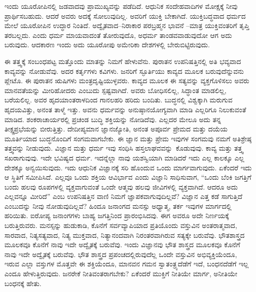 \vskip 0.2cm 

ಇಂದು ಯೂರೋಪಿನಲ್ಲಿ ಜಡವಾದವು ಪ್ರಾಮುಖ್ಯವನ್ನು ಪಡೆದಿದೆ. ಆಧುನಿಕ ಸಂದೇಹವಾದಿಗಳ ಮೋಕ್ಷಕ್ಕೆ ನೀವು ಪ್ರಾರ್ಥಿಸಬಹುದು. ಆದರೆ ಅವರು ಅದಕ್ಕೆ ಸೋಲುವುದಿಲ್ಲ. ಅವರಿಗೆ ಯುಕ್ತಿ ಬೇಕಾಗಿದೆ. ಯುಕ್ತಿಬದ್ಧವಾದ ಧರ್ಮದ ಮೇಲೆ ಯೂರೋಪಿನ ಉದ್ಧಾರ ನಿಂತಿದೆ. ಅದ್ವೈತವಾದ–ನಿರಾಕಾರ ಪರಬ್ರಹ್ಮನ ಭಾವನೆ –ಮಾತ್ರ ಯುಕ್ತಿವಂತರಿಗೆ ತೃಪ್ತಿ ತರಬಲ್ಲದು. ಎಂದು ಧರ್ಮ ಮಾಯವಾದಂತೆ ತೋರುವುದೊ, ಅಧರ್ಮ ತಾಂಡವವಾಡುವುದೋ ಆಗ ಅದು ಬರುವುದು. ಆದಕಾರಣ ಇಂದು ಅದು ಯೂರೋಪು ಅಮೇರಿಕಾ ದೇಶಗಳಲ್ಲಿ ಬೇರುಬಿಟ್ಟಿರುವುದು.

\vskip 0.2cm 

ಈ ತತ್ತ್ವಕ್ಕೆ ಸಂಬಂಧಪಟ್ಟ ಮತ್ತೊಂದು ಮಾತನ್ನು ನಿಮಗೆ ಹೇಳುವೆನು. ಪುರಾತನ ಉಪನಿಷತ್ತಿನಲ್ಲಿ ಅತಿ ಭವ್ಯವಾದ ಕಾವ್ಯವನ್ನು ನೋಡುವೆವು. ಅದರ ಕರ್ತೃಗಳು ಕವಿಗಳು. ಜನರಿಗೆ ಸ್ಫೂರ್ತಿಯು ಕಾವ್ಯದ ಮೂಲಕ ಬರುವುದೆನ್ನುವನು ಪ್ಲೇಟೊ. ಈ ಪುರಾತನ ಋಷಿಗಳು ಮಂತ್ರದೃಷ್ಟಿಯುಳ್ಳವರು. ಕಾವ್ಯದ ಮೂಲಕ ಈ ಸತ್ಯವನ್ನು ವ್ಯಕ್ತಗೊಳಿಸಲು ಅವರು ಮಾನವತೆಯನ್ನು ಮೀರಿಹೋದರು ಎಂಬುದು ಸ್ಪಷ್ಟವಾಗಿದೆ. ಅವರು ಬೋಧಿಸಲಿಲ್ಲ, ಸಿದ್ಧಾಂತ ಮಾಡಲಿಲ್ಲ, ಬರೆಯಲಿಲ್ಲ. ಅವರ ಹೃದಯಾಂತರಾಳದಿಂದ ಗಾನಲಹರಿ ಹರಿದು ಬಂದಿತು. ಬುದ್ಧನಲ್ಲಿ ವಿಶ್ವಕ್ಕಾಗಿ ಮರುಗುವ ಹೃದಯವಿತ್ತು, ಅನಂತ ತಾಳ್ಮೆ ಇತ್ತು. ಅವನು ಧರ್ಮವನ್ನು ಅನುಷ್ಠಾನಯೋಗ್ಯವಾಗಿ ಮಾಡಿ ಎಲ್ಲರಿಗೂ ನಿಲುಕುವಂತೆ ಮಾಡಿದ. ಶಂಕರಾಚಾರ್ಯರಲ್ಲಿ ಪ್ರಚಂಡ ಬುದ್ಧಿ ಶಕ್ತಿಯನ್ನು ನೋಡಿದೆವು. ಎಲ್ಲದರ ಮೇಲೂ ಅದು ತನ್ನ ತೀಕ್ಷ್ಣಪ್ರಭೆಯನ್ನು ಬೀರುತ್ತಿತ್ತು. ದೇದೀಪ್ಯಮಾನ ಜ್ಞಾನಜ್ಯೋತಿ, ಅನಂತ ಅಪೂರ್ವ ಪ್ರೇಮದ ಮತ್ತು ದಯೆಯ ಮೂರ್ತಿಯಾದ ಬುದ್ಧನೊಂದಿಗೆ ಸಂಗಮವಾಗಬೇಕು. ಈ ಜ್ಞಾನ ಮತ್ತು ಪ್ರೇಮ ಇವುಗಳ ಸಂಗಮವು ನಮಗೆ ಅತಿಶ್ರೇಷ್ಠ ತತ್ತ್ವವನ್ನು ನೀಡುವುದು. ವಿಜ್ಞಾನ ಮತ್ತು ಧರ್ಮ ಇವು ಸಂಧಿಸಿ ಹಸ್ತಲಾಘವವನ್ನು\break\ ಕೊಡುವುವು. ಕಾವ್ಯ ಮತ್ತು ತತ್ತ್ವ ಸಖರಾಗುವುವು. ಇದೇ ಭವಿಷ್ಯದ ಧರ್ಮ. ಇದನ್ನೆಲ್ಲಾ ನಾವು ಯಶಸ್ವಿಯಾಗಿ ಮಾಡಿದರೆ ಇದು ಎಲ್ಲ ಕಾಲಕ್ಕೂ ಎಲ್ಲ ದೇಶಕ್ಕೂ ಅನ್ವಯಿಸುವುದು. ಇದು ಆಧುನಿಕ ವಿಜ್ಞಾನಕ್ಕೆ ಸರಿ ಹೊಂದುವ ಒಂದು ಮಾರ್ಗವಾಗುವುದು. ಏಕೆಂದರೆ ಇದು ಆ ಸ್ಥಿತಿಗೆ ಸಮೀಪಿಸಿದೆ. ಎಲ್ಲವೂ ಒಂದು ಶಕ್ತಿಯ ಆವಿರ್ಭಾವ ಎಂದು ವಿಜ್ಞಾನಿ ಸಾಧಿಸುವಾಗ, “ಒಂದು ಬೆಂಕಿ ಜಗತ್ತಿಗೆ ಬಂದು ಹಲವು ರೂಪಗಳಲ್ಲಿ ವ್ಯಕ್ತವಾಗುವಂತೆ ಒಂದೇ ಆತ್ಮವು ಹಲವು ಜೀವಿಗಳಲ್ಲಿ ವ್ಯಕ್ತವಾಗಿದೆ. ಆದರೂ ಅದು ಎಲ್ಲವನ್ನೂ ಮೀರಿದೆ” ಎಂಬ ಉಪನಿಷತ್ತಿನ ವಾಣಿ ನಿಮಗೆ ಜ್ಞಾಪಕವಾಗುವುದಿಲ್ಲವೆ? ವಿಜ್ಞಾನ ಎತ್ತ ಕಡೆ ಸಾಗುತ್ತಿದೆ ಎಂಬುದನ್ನು ನೀವು ನೋಡುವುದಿಲ್ಲವೆ? ಹಿಂದೂ ಜನಾಂಗದ ಮನಸ್ಸು ಅಧ್ಯಾತ್ಮ, ತರ್ಕ ಇವುಗಳ ಮಾರ್ಗದಲ್ಲಿ ಹರಿಯಿತು. ಐರೋಪ್ಯ ಜನಾಂಗಗಳು ಬಾಹ್ಯ ಜಗತ್ತಿನಿಂದ ಪ್ರಾರಂಭಿಸಿದವು. ಈಗ ಅವರೂ ಅದೇ ನಿರ್ಣಯಕ್ಕೆ ಬರುತ್ತಿರುವರು. ಮನಸ್ಸನ್ನು ಹುಡುಕಾಡಿ, ಕೊನೆಗೆ ಸರ್ವವ್ಯಾಪಿಯಾದ ಪ್ರತಿಯೊಂದು ವಸ್ತುವಿನ ಅಂತರಾತ್ಮವಾದ, ಸಾರವಾದ, ನಿತ್ಯಸತ್ಯವಾದ, ನಿತ್ಯ ಮುಕ್ತವಾದ, ನಿತ್ಯಾನಂದವಾಗಿ ನಿರಂತರವಾಗಿರುವ ಸತ್ಯಕ್ಕೇ ಬರುವೆವು. ಭೌತಶಾಸ್ತ್ರದ ಮೂಲಕವೂ ಕೊನೆಗೆ ನಾವು ಇದೇ ಅದ್ವೈತಕ್ಕೆ ಬರುವೆವು. ಇಂದು ವಿಜ್ಞಾನವು ಭೌತ ಶಾಸ್ತ್ರದ ಮೂಲಕವೂ ಕೊನೆಗೆ ನಾವು ಇದೇ ಅದ್ವೈತಕ್ಕೆ ಬರುವೆವು. ಭೌತ ಶಾಸ್ತ್ರದ ಪ್ರಪಂಚದಲ್ಲಿರುವುದೆಲ್ಲ ಒಂದೇ ವಸ್ತುವಿನ ಅಭಿವ್ಯಕ್ತಿಯೆಂದೂ, ಇರುವ ಎಲ್ಲಾ ವಸ್ತುಗಳ ಮೊತ್ತವೇ ಈ ಶಕ್ತಿಯೆಂದೂ, ಮಾನವನ ಗಮನ ಸ್ವಾತಂತ್ರ್ಯದೆಡೆಗೆ ಇದೆ, ಬಂಧನದೆಡೆಗೆ ಇಲ್ಲ ಎಂದೂ ಹೇಳುತ್ತಿರುವುದು. ಜನರೇಕೆ ನೀತಿವಂತರಾಗಬೇಕು? ಏಕೆಂದರೆ ಮುಕ್ತಿಗೆ ನೀತಿಯೇ ಮಾರ್ಗ, ಅನೀತಿಯೇ ಬಂಧನಕ್ಕೆ ಹೇತು.


